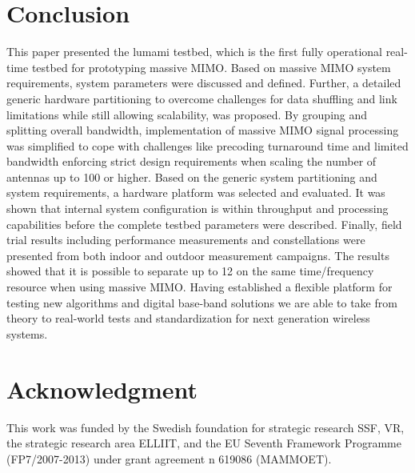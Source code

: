 \documentclass[journal]{IEEEtran}
\begin{document}
\section{Conclusion}
\label{sec:conclusion}
This paper presented the \gls{lumami} testbed, which is the first fully operational real-time testbed for prototyping massive MIMO.
Based on massive MIMO system requirements, system parameters were discussed and defined.
Further, a detailed generic hardware partitioning to overcome challenges for data shuffling and  link limitations while still allowing scalability, was proposed.
By grouping  and splitting overall bandwidth, implementation of massive MIMO signal processing was simplified to cope with challenges like  precoding turnaround time and limited  bandwidth enforcing strict design requirements when scaling the number of  antennas up to 100 or higher.
Based on the generic system partitioning and system requirements, a hardware platform was selected and evaluated.
It was shown that internal system configuration is within throughput and processing capabilities before the complete  testbed parameters were described.
Finally, field trial results including  performance measurements and constellations were presented from both indoor and outdoor measurement campaigns.
The results showed that it is possible to separate up to 12  on the same time/frequency resource when using massive MIMO.
Having established a flexible platform for testing new algorithms and digital base-band solutions we are able to take  from theory to real-world tests and standardization for next generation wireless systems. 



%
%
%
%
%
%

%
%
%
%
%
%


%
%
%

%
%
%
%


%
\section*{Acknowledgment}
This work was funded by the Swedish foundation for strategic research SSF, VR, the strategic research area ELLIIT, and the EU Seventh Framework Programme (FP7/2007-2013) under grant agreement n 619086 (MAMMOET).


%
%
\ifCLASSOPTIONcaptionsoff
  \newpage
\fi
\end{document}
